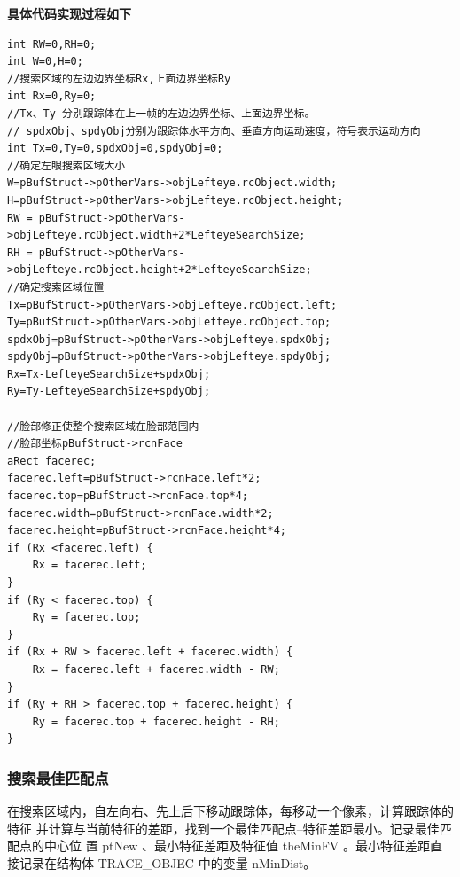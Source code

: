 \documentclass[12pt,hyperref,a4paper,UTF8]{ctexart}
\begin{document}
        \large \textbf{具体代码实现过程如下}
        \begin{lstlisting}[caption={搜索范围确定}, label={lst:example}]
int RW=0,RH=0;
int W=0,H=0;
//搜索区域的左边边界坐标Rx,上面边界坐标Ry
int Rx=0,Ry=0;
//Tx、Ty 分别跟踪体在上一帧的左边边界坐标、上面边界坐标。
// spdxObj、spdyObj分别为跟踪体水平方向、垂直方向运动速度，符号表示运动方向
int Tx=0,Ty=0,spdxObj=0,spdyObj=0;
//确定左眼搜索区域大小
W=pBufStruct->pOtherVars->objLefteye.rcObject.width;
H=pBufStruct->pOtherVars->objLefteye.rcObject.height; 
RW = pBufStruct->pOtherVars->objLefteye.rcObject.width+2*LefteyeSearchSize;
RH = pBufStruct->pOtherVars->objLefteye.rcObject.height+2*LefteyeSearchSize;
//确定搜索区域位置
Tx=pBufStruct->pOtherVars->objLefteye.rcObject.left;
Ty=pBufStruct->pOtherVars->objLefteye.rcObject.top;
spdxObj=pBufStruct->pOtherVars->objLefteye.spdxObj;
spdyObj=pBufStruct->pOtherVars->objLefteye.spdyObj;
Rx=Tx-LefteyeSearchSize+spdxObj;
Ry=Ty-LefteyeSearchSize+spdyObj;

//脸部修正使整个搜索区域在脸部范围内
//脸部坐标pBufStruct->rcnFace
aRect facerec;
facerec.left=pBufStruct->rcnFace.left*2;
facerec.top=pBufStruct->rcnFace.top*4;
facerec.width=pBufStruct->rcnFace.width*2;
facerec.height=pBufStruct->rcnFace.height*4;
if (Rx <facerec.left) {
    Rx = facerec.left;
}
if (Ry < facerec.top) {
    Ry = facerec.top;
}
if (Rx + RW > facerec.left + facerec.width) {
    Rx = facerec.left + facerec.width - RW;
}
if (Ry + RH > facerec.top + facerec.height) {
    Ry = facerec.top + facerec.height - RH;
}
        \end{lstlisting}


        \subsubsection*{\large \textbf{搜索最佳匹配点}}
        在搜索区域内，自左向右、先上后下移动跟踪体，每移动一个像素，计算跟踪体的特征
        并计算与当前特征的差距，找到一个最佳匹配点--特征差距最小。记录最佳匹配点的中心位
        置 ptNew 、最小特征差距及特征值 theMinFV 。最小特征差距直接记录在结构体
        TRACE\_OBJEC 中的变量 nMinDist。
\end{document}
